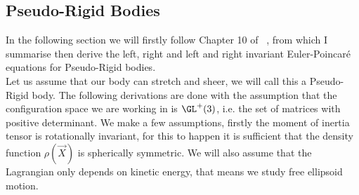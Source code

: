 
\subsection{Pseudo-Rigid Bodies}
In the following section we will firstly follow Chapter 10 of ~\cite{holm_schmah_stoica_2009}, from which I summarise then derive the left, right and left and right invariant Euler-Poincar\'e equations for Pseudo-Rigid bodies.\\ %

\noindent
Let us assume that our body can stretch and sheer, we will call this a Pseudo-Rigid body. The following derivations are done with the assumption that the configuration space we are working in is $\GL^+(3)$, i.e. the set of matrices with positive determinant. We make a few assumptions, firstly the moment of inertia tensor is rotationally invariant, for this to happen it is sufficient that the density function $\rho(\vec X)$ is spherically symmetric. We will also assume that the Lagrangian only depends on kinetic energy, that means we study free ellipsoid motion.\\

